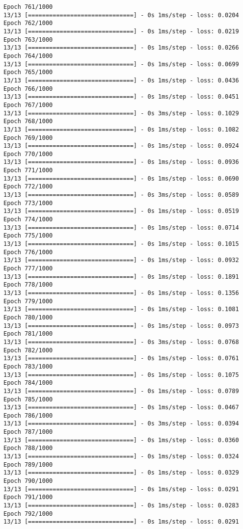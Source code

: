 \documentclass[11pt]{article}
\begin{document}
\begin{Verbatim}[commandchars=\\\{\}]
Epoch 761/1000
13/13 [==============================] - 0s 1ms/step - loss: 0.0204
Epoch 762/1000
13/13 [==============================] - 0s 1ms/step - loss: 0.0219
Epoch 763/1000
13/13 [==============================] - 0s 1ms/step - loss: 0.0266
Epoch 764/1000
13/13 [==============================] - 0s 1ms/step - loss: 0.0699
Epoch 765/1000
13/13 [==============================] - 0s 1ms/step - loss: 0.0436
Epoch 766/1000
13/13 [==============================] - 0s 1ms/step - loss: 0.0451
Epoch 767/1000
13/13 [==============================] - 0s 3ms/step - loss: 0.1029
Epoch 768/1000
13/13 [==============================] - 0s 1ms/step - loss: 0.1082
Epoch 769/1000
13/13 [==============================] - 0s 1ms/step - loss: 0.0924
Epoch 770/1000
13/13 [==============================] - 0s 1ms/step - loss: 0.0936
Epoch 771/1000
13/13 [==============================] - 0s 1ms/step - loss: 0.0690
Epoch 772/1000
13/13 [==============================] - 0s 3ms/step - loss: 0.0589
Epoch 773/1000
13/13 [==============================] - 0s 1ms/step - loss: 0.0519
Epoch 774/1000
13/13 [==============================] - 0s 1ms/step - loss: 0.0714
Epoch 775/1000
13/13 [==============================] - 0s 1ms/step - loss: 0.1015
Epoch 776/1000
13/13 [==============================] - 0s 1ms/step - loss: 0.0932
Epoch 777/1000
13/13 [==============================] - 0s 1ms/step - loss: 0.1891
Epoch 778/1000
13/13 [==============================] - 0s 1ms/step - loss: 0.1356
Epoch 779/1000
13/13 [==============================] - 0s 1ms/step - loss: 0.1081
Epoch 780/1000
13/13 [==============================] - 0s 1ms/step - loss: 0.0973
Epoch 781/1000
13/13 [==============================] - 0s 3ms/step - loss: 0.0768
Epoch 782/1000
13/13 [==============================] - 0s 1ms/step - loss: 0.0761
Epoch 783/1000
13/13 [==============================] - 0s 1ms/step - loss: 0.1075
Epoch 784/1000
13/13 [==============================] - 0s 1ms/step - loss: 0.0789
Epoch 785/1000
13/13 [==============================] - 0s 1ms/step - loss: 0.0467
Epoch 786/1000
13/13 [==============================] - 0s 3ms/step - loss: 0.0394
Epoch 787/1000
13/13 [==============================] - 0s 1ms/step - loss: 0.0360
Epoch 788/1000
13/13 [==============================] - 0s 1ms/step - loss: 0.0324
Epoch 789/1000
13/13 [==============================] - 0s 1ms/step - loss: 0.0329
Epoch 790/1000
13/13 [==============================] - 0s 1ms/step - loss: 0.0291
Epoch 791/1000
13/13 [==============================] - 0s 1ms/step - loss: 0.0283
Epoch 792/1000
13/13 [==============================] - 0s 1ms/step - loss: 0.0291

\end{Verbatim}
\end{document}
